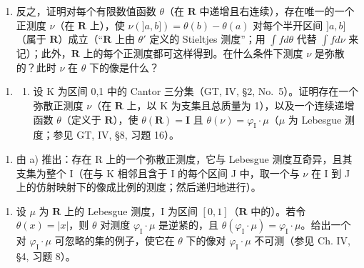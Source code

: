 \begin{enumerate}
\def\labelenumi{\alph{enumi})}
\setcounter{enumi}{2}
\tightlist
\item
  反之，证明对每个有限数值函数 \(\theta\)（在 \(\mathbf{R}\) 中递增且右连续），存在唯一的一个正测度 \(\nu\)（在 \(\mathbf{R}\) 上），使 \(\nu(]a,b]) = \theta(b) - \theta(a)\) 对每个半开区间 \(]a,b]\)（属于 \(\mathbf{R}\)）成立（“\(\mathbf{R}\) 上由 \(\theta'\) 定义的 Stieltjes 测度”；用 \(\int f d\theta\) 代替 \(\int f d\nu\) 来记）；此外，\(\mathbf{R}\) 上的每个正测度都可这样得到。在什么条件下测度 \(\nu\) 是弥散的？此时 \(\nu\) 在 \(\theta\) 下的像是什么？
\end{enumerate}

\begin{enumerate}
\def\labelenumi{\arabic{enumi})}
\setcounter{enumi}{5}
\tightlist
\item
  \begin{enumerate}
  \def\labelenumii{\alph{enumii})}
  \tightlist
  \item
    设 K 为区间 {}0,1{} 中的 Cantor 三分集（GT, IV, §2, No.~5）。证明存在一个弥散正测度 \(\nu\)（在 \(\mathbf{R}\) 上，以 K 为支集且总质量为 1），以及一个连续递增函数 \(\theta\)（定义于 \(\mathbf{R}\)），使 \(\theta(\mathbf{R}) = \mathbf{I}\) 且 \(\theta(\nu) = \varphi_{\mathrm{I}} \cdot \mu\)（\(\mu\) 为 Lebesgue 测度；参见 GT, IV, §8, 习题 16）。
  \end{enumerate}
\end{enumerate}

\begin{enumerate}
\def\labelenumi{\alph{enumi})}
\setcounter{enumi}{1}
\tightlist
\item
  由 a) 推出：存在 R 上的一个弥散正测度，它与 Lebesgue 测度互奇异，且其支集为整个 I（在与 K 相邻且含于 I 的每个区间 J 中，取一个与 \(\nu\) 在 I 到 J 上的仿射映射下的像成比例的测度；然后递归地进行）。
\end{enumerate}

\begin{enumerate}
\def\labelenumi{\arabic{enumi})}
\setcounter{enumi}{6}
\tightlist
\item
  设 \(\mu\) 为 \(\mathbf{R}\) 上的 Lebesgue 测度，I 为区间 \([0,1]\)（\(\mathbf{R}\) 中的）。若令 \(\theta(x) = |x|\)，则 \(\theta\) 对测度 \(\varphi_{\mathrm{I}} \cdot \mu\) 是逆紧的，且 \(\theta(\varphi_{\mathrm{I}} \cdot \mu) = \varphi_{\mathrm{I}} \cdot \mu\)。给出一个对 \(\varphi_{\mathrm{I}} \cdot \mu\) 可忽略的集的例子，使它在 \(\theta\) 下的像对 \(\varphi_{\mathrm{I}} \cdot \mu\) 不可测（参见 Ch. IV, §4, 习题 8）。
\end{enumerate}

